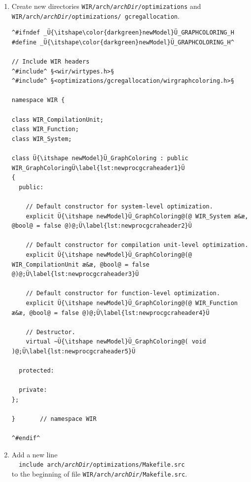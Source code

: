 \begin{enumerate}
  \item Create new directories \texttt{WIR/arch/{\itshape archDir}/optimizations} and \texttt{WIR/arch/{\itshape archDir}/optimizations/ gcregallocation}.

\begin{lstlisting}[style=code,float=!t,caption={Header File for a New Processor Model's Graph Coloring-Based Register Allocator},label=lst:newprocgcraheader]
^#ifndef _Ü{\itshape\color{darkgreen}newModel}Ü_GRAPHCOLORING_H
#define _Ü{\itshape\color{darkgreen}newModel}Ü_GRAPHCOLORING_H^

// Include WIR headers
^#include^ §<wir/wirtypes.h>§
^#include^ §<optimizations/gcregallocation/wirgraphcoloring.h>§

namespace WIR {

class WIR_CompilationUnit;
class WIR_Function;
class WIR_System;

class Ü{\itshape newModel}Ü_GraphColoring : public WIR_GraphColoringÜ\label{lst:newprocgcraheader1}Ü
{
  public:

    // Default constructor for system-level optimization.
    explicit Ü{\itshape newModel}Ü_GraphColoring@(@ WIR_System æ&æ, @bool@ = false @)@;Ü\label{lst:newprocgcraheader2}Ü

    // Default constructor for compilation unit-level optimization.
    explicit Ü{\itshape newModel}Ü_GraphColoring@(@ WIR_CompilationUnit æ&æ, @bool@ = false @)@;Ü\label{lst:newprocgcraheader3}Ü

    // Default constructor for function-level optimization.
    explicit Ü{\itshape newModel}Ü_GraphColoring@(@ WIR_Function æ&æ, @bool@ = false @)@;Ü\label{lst:newprocgcraheader4}Ü

    // Destructor.
    virtual ~Ü{\itshape newModel}Ü_GraphColoring@( void )@;Ü\label{lst:newprocgcraheader5}Ü

  protected:

  private:
};

}       // namespace WIR

^#endif^
\end{lstlisting}

  \item Add a new line \\
  \verb|  include arch/|\texttt{\itshape archDir}\verb|/optimizations/Makefile.src| \\
  to the beginning of file \texttt{WIR/arch/{\itshape archDir}/Makefile.src}.


\end{enumerate}
